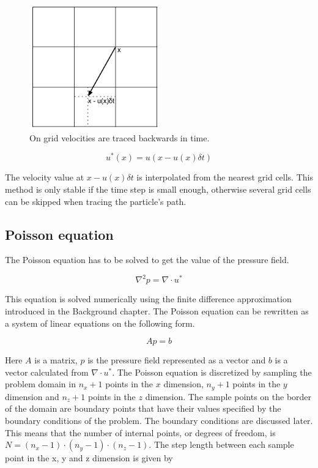 \begin{figure}[ht]
	\center
	\includegraphics[width=0.5\textwidth]{images/advect_back_trace}
	\caption{On grid velocities are traced backwards in time.}
	\label{fig:backtrace}
\end{figure}

$$ u^*(x) = u(x - u(x) \delta t) $$

The velocity value at $ x - u(x) \delta t $ is interpolated from the nearest
grid cells. This method is only stable if the time step is small enough, 
otherwise several grid cells can be skipped when tracing the particle's
path. 

\subsection{Poisson equation}

The Poisson equation has to be solved to get the value of the pressure field. 

$$ \nabla^2 p = \nabla \cdot u^* $$

This equation is solved numerically using the finite difference approximation
introduced in the Background chapter. The Poisson equation can be rewritten as 
a system of linear equations on the following form.

$$ Ap = b $$

Here $A$ is a matrix, $p$ is the pressure field represented as a vector and $b$
is a vector calculated from $\nabla \cdot u^*$. The Poisson equation is discretized 
by sampling the problem domain in $n_x+1$ points in the $x$ dimension, $n_y+1$
points in the $y$ dimension and $n_z+1$ points in the $z$ dimension. The sample
points on the border of the domain are boundary points that have their values
specified by the boundary conditions of the problem. The boundary conditions
are discussed later. This means that the number of internal points, or degrees of
freedom, is $N = (n_x-1) \cdot (n_y-1) \cdot (n_z-1)$. The step length between 
each sample point in the x, y and z dimension is given by 


